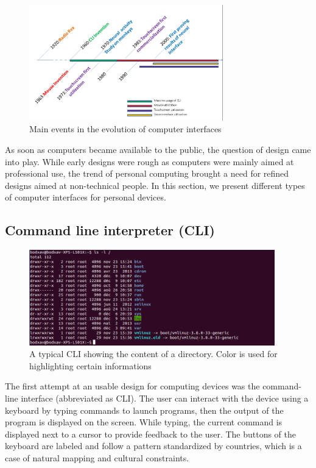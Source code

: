 \documentclass[a4paper,11pt] {article}
\theoremstyle{definition}
\begin{document}
    \begin{figure}[h]
        \centering
        \includegraphics[width=0.75\textwidth]{fig-report/timeline-interface.png}
        \caption{Main events in the evolution of computer interfaces}
        \label{fig:timeline}
    \end{figure}

    As soon as computers became available to the public, the question of design came into play. While early designs were rough as computers were mainly aimed at professional use, the trend of personal computing brought a need for refined designs aimed at non-technical people. In this section, we present different types of computer interfaces for personal devices.

    \subsection{Command line interpreter (CLI)}

    \begin{figure}[h]
        \centering
        \includegraphics[width=0.95\textwidth]{fig-report/terminal.png}
        \caption{A typical CLI showing the content of a directory. Color is used for highlighting certain informations}
        \label{fig:cli}
    \end{figure}

    The first attempt at an usable design for computing devices was the command-line interface (abbreviated as CLI). The user can interact with the device using a keyboard by typing commands to launch programs, then the output of the program is displayed on the screen. While typing, the current command is displayed next to a cursor to provide feedback to the user. The buttons of the keyboard are labeled and follow a pattern standardized by countries, which is a case of natural mapping and cultural constraints.\\
\end{document}
